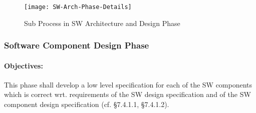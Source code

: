 \begin{figure}[ht]
  \centering
  \texttt{[image: SW-Arch-Phase-Details]}
  \caption{Sub Process in SW Architecture and Design Phase}
  \label{fig:detailed-sw-arch-phase}
\end{figure}

\tbc 

%
%
%


\subsubsection{Software Component Design Phase}
\label{sec:softw-comp-design}

\paragraph{Objectives:}
\label{sec:sw-comp-objectives}
This phase shall develop a low level specification for each of the SW components
which is correct wrt. requirements of the SW design specification and of the SW
component design specification (cf. §7.4.1.1, §7.4.1.2).


